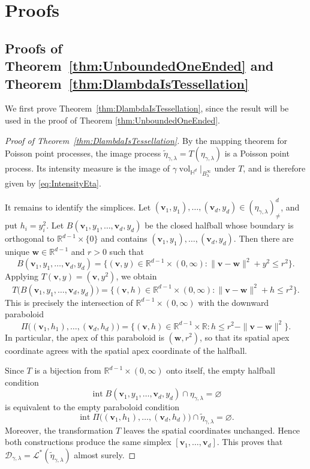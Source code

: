 \documentclass[11pt,a4paper]{article}
\theoremstyle{plain}
\theoremstyle{definition}
\theoremstyle{remark}
\newcommand{\vol}{\mathop{\mathrm{vol}}\nolimits}
\newcommand{\bv}{\boldsymbol{v}}
\newcommand{\bw}{\boldsymbol{w}}
\def\HH{\mathbb{H}}
\def\RR{\mathbb{R}}
\begin{document}
\section{Proofs}

\subsection{Proofs of Theorem~\ref{thm:UnboundedOneEnded} and Theorem~\ref{thm:DlambdaIsTessellation}}

We first prove Theorem~\ref{thm:DlambdaIsTessellation}, since the result will be used in the proof of Theorem \ref{thm:UnboundedOneEnded}.


\begin{proof}[Proof of Theorem~\ref{thm:DlambdaIsTessellation}]
	By the mapping theorem for Poisson point processes, the image process
	$\widetilde\eta_{\gamma,\lambda}=T(\eta_{\gamma,\lambda})$ is a Poisson
	point process. Its intensity measure is the image of
	$\gamma\vol_{\HH^d}|_{B_\lambda^\infty}$ under $T$, and is therefore given by
	\eqref{eq:IntensityEta}.

	It remains to identify the simplices. Let $(\bv_1,y_1),\ldots,(\bv_d,y_d)\in(\eta_{\gamma,\lambda})_{\neq}^d$, and put
	$h_i=y_i^2$. Let
	$B(\bv_1,y_1,\ldots,\bv_d,y_d)$ be the closed halfball whose boundary is orthogonal to
	$\RR^{d-1}\times\{0\}$ and contains
	$(\bv_1,y_1), \ldots, (\bv_d,y_d)$. Then there are unique
	$\bw\in\RR^{d-1}$ and $r>0$ such that
	\[
		B(\bv_1,y_1,\ldots,\bv_d,y_d)
		=
		\{(\bv,y)\in\RR^{d-1}\times(0,\infty):
		\|\bv-\bw\|^2+y^2\le r^2\}.
	\]
	Applying $T(\bv,y)=(\bv,y^2)$, we obtain
	\[
		T\big(B(\bv_1,y_1,\ldots,\bv_d,y_d)\big)
		=
		\{(\bv,h)\in\RR^{d-1}\times(0,\infty):
		\|\bv-\bw\|^2+h\le r^2\}.
	\]
	This is precisely the intersection of
	$\RR^{d-1}\times(0,\infty)$ with the downward paraboloid
	\[
		\Pi\big((\bv_1,h_1),\ldots,(\bv_d,h_d)\big)
		=
		\{(\bv,h)\in\RR^{d-1}\times\RR:
		h\le r^2-\|\bv-\bw\|^2\}.
	\]
	In particular, the apex of this paraboloid is $(\bw,r^2)$, so that its
	spatial apex coordinate agrees with the spatial apex coordinate of the
	halfball.

	Since $T$ is a bijection from
	$\RR^{d-1}\times(0,\infty)$ onto itself, the empty halfball condition
	\[
		\operatorname{int}B(\bv_1,y_1,\ldots,\bv_d,y_d)
		\cap\eta_{\gamma,\lambda}
		=
		\varnothing
	\]
	is equivalent to the empty paraboloid condition
	\[
		\operatorname{int}\Pi\big((\bv_1,h_1),\ldots,(\bv_d,h_d)\big)
		\cap\widetilde\eta_{\gamma,\lambda}
		=
		\varnothing .
	\]
	Moreover, the transformation $T$ leaves the spatial coordinates
	unchanged. Hence both constructions produce the same simplex
	$[\bv_1,\ldots,\bv_d]$. This proves that $\mathcal D_{\gamma,\lambda}=\mathcal L^*(\widetilde\eta_{\gamma,\lambda})$
	almost surely.
\end{proof}
\end{document}
